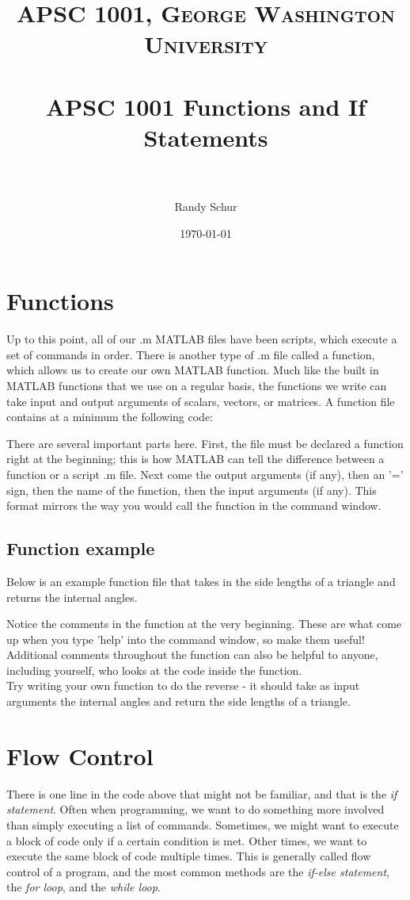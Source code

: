 \documentclass[paper=a4, fontsize=11pt]{scrartcl} %
\title{	
\normalfont \normalsize 
\textsc{APSC 1001, George Washington University} \\ [25pt] %
\horrule{0.5pt} \\[0.4cm] %
\huge APSC 1001 Functions and If Statements\\ %
\horrule{2pt} \\[0.5cm] %
}
\author{\normalsize Randy Schur } %
\date{\normalsize \today } %
\numberwithin{equation}{section} %
\numberwithin{figure}{section} %
\numberwithin{table}{section} %
\begin{document}
\maketitle %

\section{Functions}
Up to this point, all of our .m MATLAB files have been scripts, which execute a set of commands in order.  There is another type of .m file called a function, which allows us to create our own MATLAB function. Much like the built in MATLAB functions that we use on a regular basis, the functions we write can take input and output arguments of scalars, vectors, or matrices. A function file contains at a minimum the following code:



There are several important parts here. 
First, the file must be declared a function right at the beginning; this is how MATLAB can tell the difference between a function or a script .m file. 
Next come the output arguments (if any), then an '=' sign, then the name of the function, then the input arguments (if any). 
This format mirrors the way you would call the function in the command window. 

\subsection{Function example}
Below is an example function file that takes in the side lengths of a triangle and returns the internal angles. 


Notice the comments in the function at the very beginning. 
These are what come up when you type 'help' into the command window, so make them useful! 
Additional comments throughout the function can also be helpful to anyone, including yourself, who looks at the code inside the function.\\

Try writing your own function to do the reverse - it should take as input arguments the internal angles and return the side lengths of a triangle.


\section{Flow Control}
There is one line in the code above that might not be familiar, and that is the \textit{if statement}. 
Often when programming, we want to do something more involved than simply executing a list of commands. 
Sometimes, we might want to execute a block of code only if a certain condition is met.
Other times, we want to execute the same block of code multiple times.
This is generally called flow control of a program, and the most common methods are the \textit{if-else statement}, the \textit{for loop}, and the \textit{while loop}.
\end{document}
